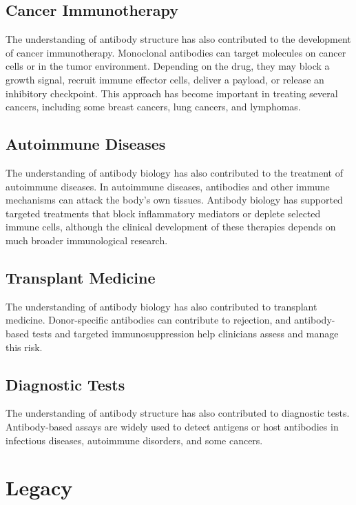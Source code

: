 \subsection{Cancer Immunotherapy}

The understanding of antibody structure has also contributed to the development of cancer immunotherapy. Monoclonal antibodies can target molecules on cancer cells or in the tumor environment. Depending on the drug, they may block a growth signal, recruit immune effector cells, deliver a payload, or release an inhibitory checkpoint. This approach has become important in treating several cancers, including some breast cancers, lung cancers, and lymphomas.

\subsection{Autoimmune Diseases}

The understanding of antibody biology has also contributed to the treatment of autoimmune diseases. In autoimmune diseases, antibodies and other immune mechanisms can attack the body's own tissues. Antibody biology has supported targeted treatments that block inflammatory mediators or deplete selected immune cells, although the clinical development of these therapies depends on much broader immunological research.

\subsection{Transplant Medicine}

The understanding of antibody biology has also contributed to transplant medicine. Donor-specific antibodies can contribute to rejection, and antibody-based tests and targeted immunosuppression help clinicians assess and manage this risk.

\subsection{Diagnostic Tests}

The understanding of antibody structure has also contributed to diagnostic tests. Antibody-based assays are widely used to detect antigens or host antibodies in infectious diseases, autoimmune disorders, and some cancers.

\section{Legacy}

